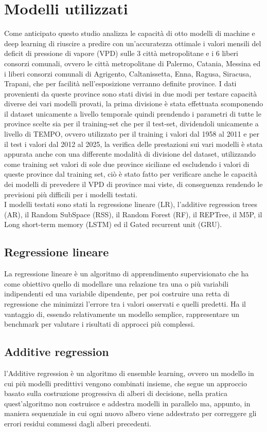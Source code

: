 \section{Modelli utilizzati}
Come anticipato questo studio analizza le capacità di otto modelli di machine e deep learning di riuscire a predire con un'accuratezza ottimale i valori mensili del deficit di pressione di vapore (VPD) sulle 3 città metropolitane e i 6 liberi consorzi comunali, ovvero le città metropolitane di Palermo, Catania, Messina ed i liberi consorzi comunali di Agrigento, Caltanissetta, Enna, Ragusa, Siracusa, Trapani, che per facilità nell'esposizione verranno definite province. I dati provenienti da queste province sono stati divisi in due modi per testare capacità diverse dei vari modelli provati, la prima divisione è stata effettuata scomponendo il dataset unicamente a livello temporale quindi prendendo i parametri di tutte le province scelte sia per il training-set che per il test-set, dividendoli unicamente a livello di TEMPO, ovvero utilizzato per il training i valori dal 1958 al 2011 e per il test i valori dal 2012 al 2025, la verifica delle prestazioni sui vari modelli è stata appurata anche con una differente modalità di divisione del dataset, utilizzando come training set valori di sole due province siciliane ed escludendo i valori di queste province dal training set, ciò è stato fatto per verificare anche le capacità dei modelli di prevedere il VPD di province mai viste, di conseguenza rendendo le previsioni più difficili per i modelli testati.\\
I modelli testati sono stati la regressione lineare (LR), l'additive regression trees (AR), il Random SubSpace (RSS), il Random Forest (RF), il REPTree, il M5P, il Long short-term memory (LSTM) ed il Gated recurrent unit (GRU).\\

\subsection{Regressione lineare}
La regressione lineare è un algoritmo di apprendimento supervisionato che ha come obiettivo quello di modellare una relazione tra una o più variabili indipendenti ed una variabile dipendente, per poi costruire una retta di regressione che minimizzi l'errore tra i valori osservati e quelli predetti. Ha il vantaggio di, essendo relativamente un modello semplice, rappresentare un benchmark per valutare i risultati di approcci più complessi.

\subsection{Additive regression}
l'Additive regression è un algoritmo di ensemble learning, ovvero un modello in cui più modelli predittivi vengono combinati insieme, che segue un approccio basato sulla costruzione progressiva di alberi di decisione, nella pratica quest'algoritmo non costruisce e addestra modelli in parallelo ma, appunto, in maniera sequenziale in cui ogni nuovo albero viene addestrato per correggere gli errori residui commessi dagli alberi precedenti.

